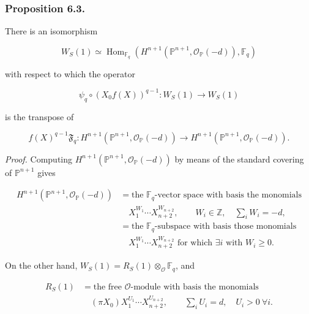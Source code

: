 \subsubsection*{Proposition 6.3.}
There is an isomorphism

\begin{equation}\tag{6.3.1}
W_S(1)\simeq
\operatorname{Hom}_{\mathbb F_q}\!\left(
H^{n+1}(\mathbb P^{n+1},\mathcal O_{\mathbb P}(-d)),
\mathbb F_q\right)
\end{equation}

with respect to which the operator

\begin{equation}\tag{6.3.2}
\psi_q\circ(X_0f(X))^{q-1}:W_S(1)\longrightarrow W_S(1)
\end{equation}

is the transpose of

\begin{equation}\tag{6.3.3}
f(X)^{q-1}\mathfrak F_q:
H^{n+1}(\mathbb P^{n+1},\mathcal O_{\mathbb P}(-d))
\longrightarrow
H^{n+1}(\mathbb P^{n+1},\mathcal O_{\mathbb P}(-d)).
\end{equation}

\noindent\emph{Proof.}
Computing
$H^{n+1}(\mathbb P^{n+1},\mathcal O_{\mathbb P}(-d))$
by means of the standard covering of $\mathbb P^{n+1}$ gives

\begin{equation}\tag{6.3.4}
\begin{aligned}
H^{n+1}(\mathbb P^{n+1},\mathcal O_{\mathbb P}(-d))
&=\text{the $\mathbb F_q$-vector space with basis the monomials}\\
&\quad X_1^{W_1}\cdots X_{n+2}^{W_{n+2}},
\qquad W_i\in\mathbb Z,\quad\sum_iW_i=-d,\\
&=\text{the $\mathbb F_q$-subspace with basis those monomials}\\
&\quad X_1^{W_1}\cdots X_{n+2}^{W_{n+2}}
\text{ for which }\exists i\text{ with }W_i\geq0.
\end{aligned}
\end{equation}

On the other hand, $W_S(1)=R_S(1)\otimes_{\mathcal O}\mathbb F_q$, and

\begin{equation}\tag{6.3.5}
\begin{aligned}
R_S(1)
&=\text{the free $\mathcal O$-module with basis the monomials}\\
&\quad
(\pi X_0)X_1^{U_1}\cdots X_{n+2}^{U_{n+2}},
\qquad
\sum_iU_i=d,\quad U_i>0\ \forall i.
\end{aligned}
\end{equation}

